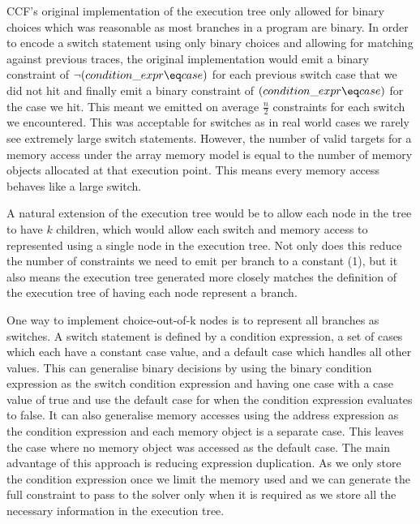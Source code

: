 \documentclass[12pt,twoside]{report}
\begin{document}
CCF's original implementation of the execution tree only allowed for binary choices which was reasonable as most branches in a program are binary. In order to encode a switch statement using only binary choices and allowing for matching against previous traces, the original implementation would emit a binary constraint of $\neg{(condition\_expr \eq case)}$ for each previous switch case that we did not hit and finally emit a binary constraint of $(condition\_expr \eq case)$ for the case we hit. This meant we emitted on average $\frac{n}{2}$ constraints for each switch we encountered. This was acceptable for switches as in real world cases we rarely see extremely large switch statements. However, the number of valid targets for a memory access under the array memory model is equal to the number of memory objects allocated at that execution point. This means every memory access behaves like a large switch.

A natural extension of the execution tree would be to allow each node in the tree to have $k$ children, which would allow each switch and memory access to represented using a single node in the execution tree. Not only does this reduce the number of constraints we need to emit per branch to a constant (1), but it also means the execution tree generated more closely matches the definition of the execution tree of having each node represent a branch.

One way to implement choice-out-of-k nodes is to represent all branches as switches. A switch statement is defined by a condition expression, a set of cases which each have a constant case value, and a default case which handles all other values. This can generalise binary decisions by using the binary condition expression as the switch condition expression and having one case with a case value of true and use the default case for when the condition expression evaluates to false. It can also generalise memory accesses using the address expression as the condition expression and each memory object is a separate case. This leaves the case where no memory object was accessed as the default case. The main advantage of this approach is reducing expression duplication. As we only store the condition expression once we limit the memory used and we can generate the full constraint to pass to the solver only when it is required as we store all the necessary information in the execution tree.
\end{document}
